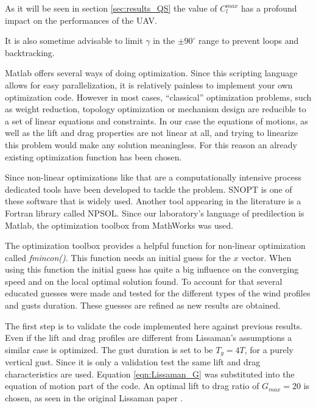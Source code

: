 As it will be seen in section \ref{sec:results_QS} the value of $C_l^{max}$ has a profound impact on the performances of the UAV.

\par It is also sometime advisable to limit $\gamma$ in the $\pm 90^{\circ}$ range to prevent loops and backtracking.


Matlab offers several ways of doing optimization.
Since this scripting language allows for easy parallelization, it is relatively painless to implement your own optimization code.
However in most cases, ``classical'' optimization problems, such as weight reduction, topology optimization or mechanism design are reducible to a set of linear equations and constraints.
In our case the equations of motions, as well as the lift and drag properties are not linear at all, and trying to linearize this problem would make any solution meaningless.
For this reason an already existing optimization function has been chosen.

\par Since non-linear optimizations like that are a computationally intensive process dedicated tools have been developed to tackle the problem.
SNOPT \cite{SNOPT} is one of these software that is widely used.
Another tool appearing in the literature is a Fortran library called NPSOL.
Since our laboratory's language of predilection is Matlab, the optimization toolbox from MathWorks was used.

\par The optimization toolbox provides a helpful function for non-linear optimization called \emph{fmincon()}.
This function needs an initial guess for the $x$ vector.
When using this function the initial guess has quite a big influence on the converging speed and on the local optimal solution found.
To account for that several educated guesses were made and tested for the different types of the wind profiles and gusts duration.
These guesses are refined as new results are obtained.


 \label{sec:results_QS}

The first step is to validate the code implemented here against previous results. 
Even if the lift and drag profiles are different from Lissaman's assumptions a similar case is optimized.
The gust duration is set to be $T_g=4 T$, for a purely vertical gust.
Since it is only a validation test the same lift and drag characteristics are used. Equation \ref{eqn:Lissaman_G} was substituted into the equation of motion part of the code. An optimal lift to drag ratio of $G_{max}=20$ is chosen, as seen in the original Lissaman paper \cite{Lissaman2007neutral}.

